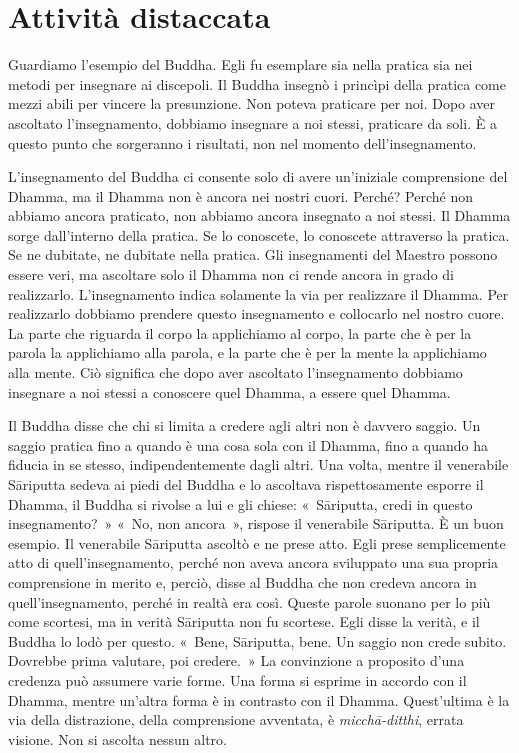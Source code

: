 \chapter{Attività distaccata}

Guardiamo l'esempio del Buddha. Egli fu esemplare sia nella pratica sia
nei metodi per insegnare ai discepoli. Il Buddha insegnò i princìpi
della pratica come mezzi abili per vincere la presunzione. Non poteva
praticare per noi. Dopo aver ascoltato l'insegnamento, dobbiamo
insegnare a noi stessi, praticare da soli. È a questo punto che
sorgeranno i risultati, non nel momento dell'insegnamento.

L'insegnamento del Buddha ci consente solo di avere un'iniziale
comprensione del Dhamma, ma il Dhamma non è ancora nei nostri cuori.
Perché? Perché non abbiamo ancora praticato, non abbiamo ancora
insegnato a noi stessi. Il Dhamma sorge dall'interno della pratica. Se
lo conoscete, lo conoscete attraverso la pratica. Se ne dubitate, ne
dubitate nella pratica. Gli insegnamenti del Maestro possono essere
veri, ma ascoltare solo il Dhamma non ci rende ancora in grado di
realizzarlo. L'insegnamento indica solamente la via per realizzare il
Dhamma. Per realizzarlo dobbiamo prendere questo insegnamento e
collocarlo nel nostro cuore. La parte che riguarda il corpo la
applichiamo al corpo, la parte che è per la parola la applichiamo alla
parola, e la parte che è per la mente la applichiamo alla mente. Ciò
significa che dopo aver ascoltato l'insegnamento dobbiamo insegnare a
noi stessi a conoscere quel Dhamma, a essere quel Dhamma.

Il Buddha disse che chi si limita a credere agli altri non è davvero
saggio. Un saggio pratica fino a quando è una cosa sola con il Dhamma,
fino a quando ha fiducia in se stesso, indipendentemente dagli altri.
Una volta, mentre il venerabile Sāriputta sedeva ai piedi del Buddha e
lo ascoltava rispettosamente esporre il Dhamma, il Buddha si rivolse a
lui e gli chiese: «~Sāriputta, credi in questo insegnamento?~» «~No, non
ancora~», rispose il venerabile Sāriputta. È un buon esempio. Il
venerabile Sāriputta ascoltò e ne prese atto. Egli prese semplicemente
atto di quell'insegnamento, perché non aveva ancora sviluppato una sua
propria comprensione in merito e, perciò, disse al Buddha che non
credeva ancora in quell'insegnamento, perché in realtà era così. Queste
parole suonano per lo più come scortesi, ma in verità Sāriputta non fu
scortese. Egli disse la verità, e il Buddha lo lodò per questo. «~Bene,
Sāriputta, bene. Un saggio non crede subito. Dovrebbe prima valutare,
poi credere.~» La convinzione a proposito d'una credenza può assumere
varie forme. Una forma si esprime in accordo con il Dhamma, mentre
un'altra forma è in contrasto con il Dhamma. Quest'ultima è la via della
distrazione, della comprensione avventata, è \emph{micchā-ditthi},
errata visione. Non si ascolta nessun altro.

